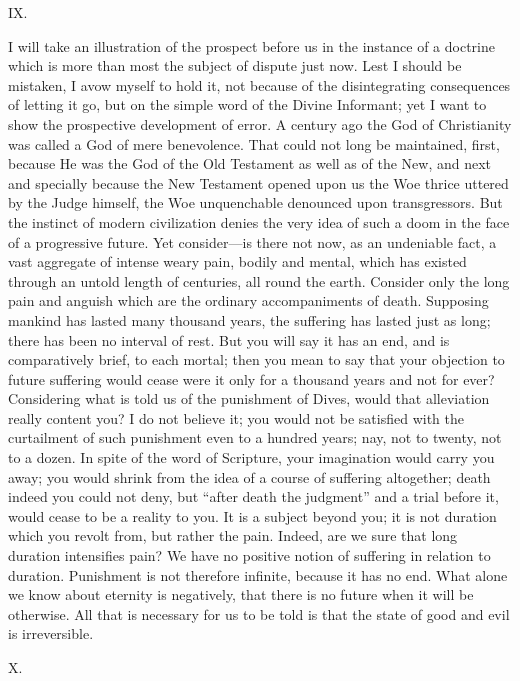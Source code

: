 IX.

I will take an illustration of the prospect before us in the
instance of a doctrine which is more than most the subject of dispute
just now. Lest I should be mistaken, I avow myself to hold it, not
because of the disintegrating consequences of letting it go, but on
the simple word of the Divine Informant; yet I want to show the
prospective development of error. A century ago the God of
Christianity was called a God of mere benevolence. That could not long
be maintained, first, because He was the God of the Old Testament as
well as of the New, and next and specially because the New Testament
opened upon us the Woe thrice uttered by the Judge himself, the Woe
unquenchable denounced upon transgressors. But the instinct of modern
civilization denies the very idea of such a doom in the face of a
progressive future. Yet consider—is there not now, as an undeniable
fact, a vast aggregate of intense weary pain, bodily and mental, which
has existed through an untold length of centuries, all round the
earth. Consider only the long pain and anguish which are the ordinary
accompaniments of death. Supposing mankind has lasted many thousand
years, the suffering has lasted just as long; there has been no
interval of rest. But you will say it has an end, and is comparatively
brief, to each mortal; then you mean to say that your objection to
future suffering would cease were it only for a thousand years and not
for ever? Considering what is told us of the punishment of Dives,
would that alleviation really content you? I do not believe it; you
would not be satisfied with the curtailment of such punishment even to
a hundred years; nay, not to twenty, not to a dozen. In spite of the
word of Scripture, your imagination would carry you away; you would
shrink from the idea of a course of suffering altogether; death indeed
you could not deny, but ``after death the judgment'' and a
trial before it, would cease to be a reality to you. It is a subject
beyond you; it is not duration which you revolt from, but rather the
pain. Indeed, are we sure that long duration intensifies pain? We have
no positive notion of suffering in relation to duration. Punishment is
not therefore infinite, because it has no end. What alone we know
about eternity is negatively, that there is no future when it will be
otherwise. All that is necessary for us to be told is that the state
of good and evil is irreversible.

X.

